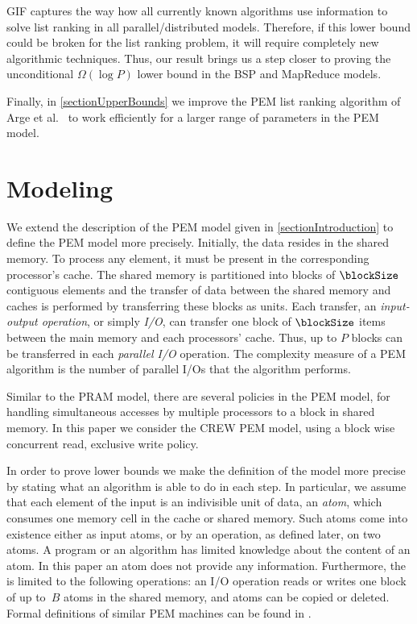 \documentclass[envcountsame]{llncs}
\begin{document}
GIF captures the way how all currently known algorithms use information to solve list ranking in all parallel/distributed models.
Therefore, if this lower bound could be broken for the list ranking problem, it will require completely new algorithmic techniques.
Thus, our result brings us a step closer to proving the unconditional $\Omega(\log P)$ lower bound in the BSP and MapReduce models.

Finally, in \autoref{sectionUpperBounds} we improve the PEM list ranking algorithm of Arge et al.~\cite{2010ArgeEtAlGraphAlgoPEM} to work efficiently for a larger range of parameters in the PEM model.  


\section{Modeling}
\label{sectionModelling}

We extend the description of the PEM model given in \autoref{sectionIntroduction} to define the PEM model more precisely. 
Initially, the data resides in the shared memory. 
To process any element, it must be present in the corresponding processor's cache.
The shared memory is partitioned into blocks of $\blockSize$ contiguous elements and the transfer of data between the shared memory and caches is performed by transferring these blocks as units.
Each transfer, an {\em input-output operation}, or simply {\em I/O}, can transfer one block of $\blockSize$ items between the main memory and each processors' cache. 
Thus, up to $P$ blocks can be transferred in each \emph{parallel I/O} operation. 
The complexity measure of a PEM algorithm is the number of parallel I/Os that the algorithm performs.  

Similar to the PRAM model, there are several policies in the PEM model, for handling simultaneous accesses by multiple processors to a block in shared memory. 
In this paper we consider the CREW PEM model, using a block wise concurrent read, exclusive write policy.




In order to prove lower bounds we make the definition of the model more precise by stating what an algorithm is able to do in each step.
In particular, we assume that each element of the input is an indivisible unit of data, an {\em atom}, which consumes one memory cell in the cache or shared memory.
Such atoms come into existence either as input atoms, or by an operation, as defined later, on two atoms.
A program or an algorithm has limited knowledge about the content of an atom. 
In this paper an atom does not provide any information. 
Furthermore, the \emph{\movePEM} is limited to the following operations: 
an I/O operation reads or writes one block of up to~$B$ atoms in the shared memory, and atoms can be copied or deleted.
Formal definitions of similar PEM machines can be found in \cite{2008ArgeEtAlFundamentalPEM,2012ThesisGero}.
\end{document}
